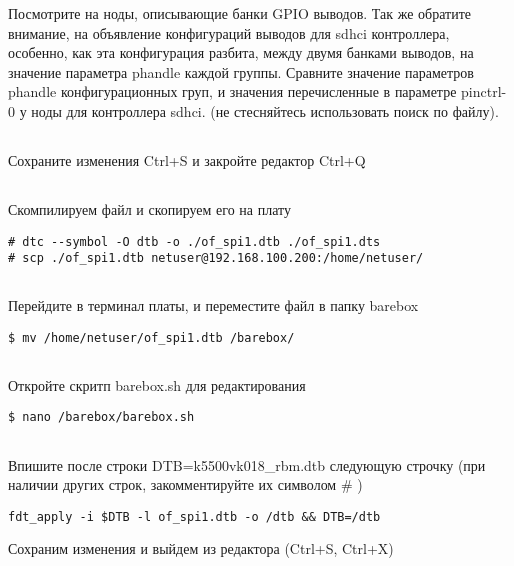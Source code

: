 Посмотрите на ноды, описывающие банки GPIO выводов. Так же обратите внимание, на объявление конфигураций выводов для sdhci контроллера, особенно, как эта конфигурация разбита, между двумя банками выводов, на значение параметра phandle каждой группы. Сравните значение параметров phandle конфигурационных груп, и значения перечисленные в параметре pinctrl-0 у ноды для контроллера  sdhci. (не стесняйтесь использовать поиск по файлу).

\subsection{}Сохраните изменения Ctrl+S и закройте редактор Ctrl+Q 

\subsection{}Скомпилируем файл и скопируем его на плату
\begin{lstlisting}[style=bash]
# dtc --symbol -O dtb -o ./of_spi1.dtb ./of_spi1.dts
# scp ./of_spi1.dtb netuser@192.168.100.200:/home/netuser/
\end{lstlisting}

\subsection{}Перейдите в терминал платы, и переместите файл в папку barebox
\begin{lstlisting}[style=bash]
$ mv /home/netuser/of_spi1.dtb /barebox/
\end{lstlisting}

\subsection{}Откройте скритп barebox.sh для редактирования
\begin{lstlisting}[style=bash]
$ nano /barebox/barebox.sh
\end{lstlisting}

\subsection{}Впишите после строки DTB=k5500vk018\_rbm.dtb следующую строчку (при наличии других строк, закомментируйте их символом \# )
\begin{lstlisting}[style=stdout]
fdt_apply -i $DTB -l of_spi1.dtb -o /dtb && DTB=/dtb
\end{lstlisting}
Сохраним изменения и выйдем из редактора (Ctrl+S, Ctrl+X)

